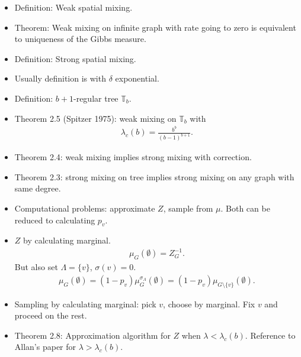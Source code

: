 \documentclass[11pt]{article} \usepackage{amssymb}
\newcommand{\tree}{\mathbb{T}}
\newcommand{\act}{\lambda}
\begin{document}
\begin{itemize}
\item Definition: Weak spatial mixing.
\item Theorem: Weak mixing on infinite graph with rate going to zero
  is equivalent to uniqueness of the Gibbs measure.
\item Definition: Strong spatial mixing.
\item Usually definition is with $\delta$ exponential.
\item Definition: $b+1$-regular tree $\tree_b$.
\item Theorem 2.5 (Spitzer 1975): weak mixing on $\tree_b$ with
  \begin{align*}
    \act_c(b) = \frac{b^b}{(b-1)^{b+1}}.
  \end{align*}
\item Theorem 2.4: weak mixing implies strong mixing with correction.
\item Theorem 2.3: strong mixing on tree implies strong mixing on any
  graph with same degree.
\item Computational problems: approximate $Z$, sample from $\mu$. Both
  can be reduced to calculating $p_v$.
\item $Z$ by calculating marginal.
  \begin{align*}
    \mu_G(\emptyset) = Z_G^{-1}.
  \end{align*}
  But also set $\Lambda = \{v\}$, $\sigma(v)=0$.
  \begin{align*}
    \mu_G(\emptyset) =
    (1-p_v)\mu_G^{\sigma_\Lambda}(\emptyset)=(1-p_v)\mu_{G\setminus\{v\}}(\emptyset).
  \end{align*}
  
\item Sampling by calculating marginal: pick $v$, choose by marginal. Fix $v$ and
  proceed on the rest.
\item Theorem 2.8: Approximation algorithm for $Z$ when $\act <
  \act_c(b)$. Reference to Allan's paper for $\act > \act_c(b)$.
\end{itemize}
\end{document}

